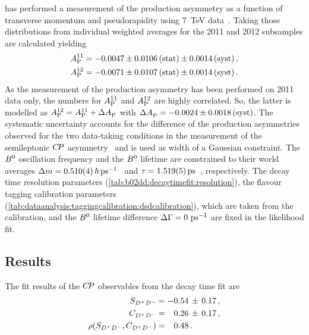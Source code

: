 \lhcb has performed a measurement of the production asymmetry as a function
of transverse momentum and pseudorapidity using \SI{7}{\TeV}
data~\cite{LHCb-PAPER-2014-042}. Taking those distributions from \BdToDD
individual weighted averages for the 2011 and 2012 subsamples are calculated
yielding
%
\begin{equation}
  \begin{split}
    A_\text{P}^{11} &= -0.0047 \pm 0.0106 \,\text{(stat)} \pm 0.0014 \, \text{(syst)} \,, \\
    A_\text{P}^{12} &= -0.0071 \pm 0.0107 \,\text{(stat)} \pm 0.0014 \, \text{(syst)} \,.
  \end{split}
\end{equation}
%
As the measurement of the production asymmetry has been performed on 2011 data
only, the numbers for $A_\text{P}^{11}$ and $A_\text{P}^{12}$ are highly
correlated. So, the latter is modelled as $A_\text{P}^{12} = A_\text{P}^{11} +
\Delta A_\text{P}^{}$ with $\Delta A_\text{P}^{} = -0.0024 \pm 0.0018
\,\text{(syst)}$. The systematic uncertainty accounts for the difference of
the production asymmetries observed for the two data-taking conditions in the
measurement of the semileptonic ${C\!P}$ asymmetry~\cite{LHCb-PAPER-2014-053} and
is used as width of a Gaussian constraint. The ${{B}^0}$ oscillation frequency and
the ${{B}^0}$ lifetime are constrained to their world averages $\dm =
\SI{0.510\pm0.004}{\planckbar\invps}$~\cite{HFAG} and $\tau =
\SI{1.519\pm0.005}{\ps}$~\cite{PDG2014}, respectively. The decay time
resolution parameters (\cref{tab:b02dd:decaytimefit:resolution}), the flavour
tagging calibration parameters
(\cref{tab:dataanalysis:taggingcalibration:dsdcalibration}), which are taken
from the \BdToDsD calibration, and the ${{B}^0}$ lifetime difference ${\Delta\Gamma} =
\SI{0}{\ensuremath{{\mathrm{ \,ps^{-1}}}}}$ are fixed in the likelihood fit.

\subsection{Results}

The fit results of the ${C\!P}$ observables from the decay time fit are
\begin{align}
\begin{split}
  S_{{{D}^+}{{D}^-}}                &= -0.54\,\pm\,0.17 \, , \\
  C_{{{D}^+}{{D}^-}}                &= \phantom{-}0.26\,\pm\,0.17 \, , \\
  \rho(S_{{{D}^+}{{D}^-}},C_{{{D}^+}{{D}^-}})     &= \phantom{-}0.48 \, . \\
\end{split}
\label{eq:b02dd:decaytimefit:cpresults}
\end{align}

